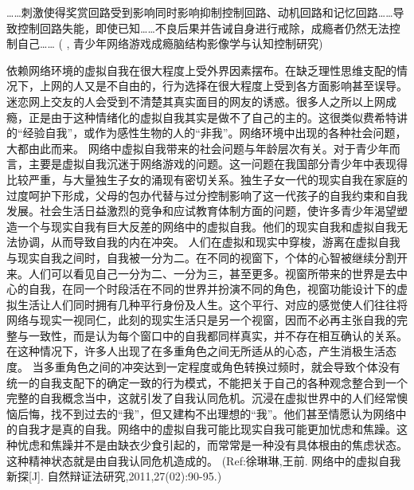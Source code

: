 ……刺激使得奖赏回路受到影响同时影响抑制控制回路、动机回路和记忆回路……导致控制回路失能，即使已知……不良后果并告诫自身进行戒除，成瘾者仍然无法控制自己……
	(	\cite{}, 青少年网络游戏成瘾脑结构影像学与认知控制研究)

依赖网络环境的虚拟自我在很大程度上受外界因素摆布。在缺乏理性思维支配的情况下，上网的人又是不自由的，行为选择在很大程度上受到各方面影响甚至误导。迷恋网上交友的人会受到不清楚其真实面目的网友的诱惑。很多人之所以上网成瘾，正是由于这种情绪化的虚拟自我其实是做不了自己的主的。这很类似费希特讲的“经验自我”，或作为感性生物的人的“非我”。网络环境中出现的各种社会问题，大都由此而来。
网络中虚拟自我带来的社会问题与年龄层次有关。对于青少年而言，主要是虚拟自我沉迷于网络游戏的问题。这一问题在我国部分青少年中表现得比较严重，与大量独生子女的涌现有密切关系。独生子女一代的现实自我在家庭的过度呵护下形成，父母的包办代替与过分控制影响了这一代孩子的自我约束和自我发展。社会生活日益激烈的竞争和应试教育体制方面的问题，使许多青少年渴望塑造一个与现实自我有巨大反差的网络中的虚拟自我。他们的现实自我和虚拟自我无法协调，从而导致自我的内在冲突。
人们在虚拟和现实中穿梭，游离在虚拟自我与现实自我之间时，自我被一分为二。在不同的视窗下，个体的心智被继续分割开来。人们可以看见自己一分为二、一分为三，甚至更多。视窗所带来的世界是去中心的自我，在同一个时段活在不同的世界并扮演不同的角色，视窗功能设计下的虚拟生活让人们同时拥有几种平行身份及人生。这个平行、对应的感觉使人们往往将网络与现实一视同仁，此刻的现实生活只是另一个视窗，因而不必再主张自我的完整与一致性，而是认为每个窗口中的自我都同样真实，并不存在相互确认的关系。在这种情况下，许多人出现了在多重角色之间无所适从的心态，产生消极生活态度。
当多重角色之间的冲突达到一定程度或角色转换过频时，就会导致个体没有统一的自我支配下的确定一致的行为模式，不能把关于自己的各种观念整合到一个完整的自我概念当中，这就引发了自我认同危机。沉浸在虚拟世界中的人们经常懊恼后悔，找不到过去的“我”，但又建构不出理想的“我”。他们甚至情愿认为网络中的自我才是真的自我。网络中的虚拟自我可能比现实自我可能更加忧虑和焦躁。这种忧虑和焦躁并不是由缺衣少食引起的，而常常是一种没有具体根由的焦虑状态。这种精神状态就是由自我认同危机造成的。
(Ref:徐琳琳,王前. 网络中的虚拟自我新探[J]. 自然辩证法研究,2011,27(02):90-95.)

